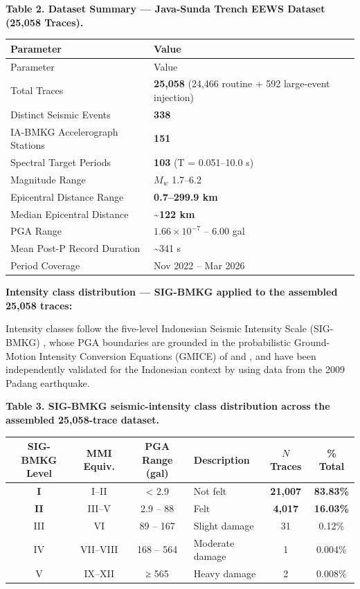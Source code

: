 \documentclass[10pt]{article}
\renewcommand{\cite}[1]{\citep{#1}}
\begin{document}
\par\vspace{16pt}\noindent\begingroup\centering\fontsize{8}{10}\selectfont\textbf{Table 2. Dataset Summary --- Java-Sunda Trench EEWS Dataset (25,058 Traces).}\par\endgroup\vspace{6pt}
\begin{longtable}[]{@{}>{\raggedright\arraybackslash}p{4cm}>{\raggedright\arraybackslash}p{8cm}@{}}
\toprule
Parameter & Value \\
\midrule
\endfirsthead
\toprule
Parameter & Value \\
\midrule
\endhead
\bottomrule
\endlastfoot
Total Traces & \textbf{25,058} (24,466 routine + 592 large-event injection) \\
Distinct Seismic Events & \textbf{338} \\
IA-BMKG Accelerograph Stations & \textbf{151}  \\
Spectral Target Periods & \textbf{103} (T = 0.051--10.0 s) \\
Magnitude Range & \(M_w\) 1.7--6.2 \\
Epicentral Distance Range & \textbf{0.7--299.9 km} \\
Median Epicentral Distance & \textbf{\textasciitilde122 km} \\
PGA Range & \(1.66 \times 10^{-7}\) -- 6.00 gal \\
Mean Post-P Record Duration & \textasciitilde341 s \\
Period Coverage & Nov 2022 -- Mar 2026 \\
\end{longtable}

\textbf{Intensity class distribution --- SIG-BMKG \cite{BMKG2016} applied to the assembled 25,058 traces:}

Intensity classes follow the five-level Indonesian Seismic Intensity Scale (SIG-BMKG) \cite{BMKG2016}, whose PGA boundaries are grounded in the probabilistic Ground-Motion Intensity Conversion Equations (GMICE) of \citet{Worden2012} and \citet{Wald1999}, and have been independently validated for the Indonesian context by \citet{Caprio2015} using data from the 2009 Padang earthquake.

\begin{center}\fontsize{8}{10}\selectfont\textbf{Table 3. SIG-BMKG seismic-intensity class distribution across the assembled 25{,}058-trace dataset.}\end{center}

\begin{longtable}[]{@{}ccclcc@{}}
\toprule
SIG-BMKG Level & MMI Equiv. & PGA Range (gal) & Description & \(N\) Traces & \% Total\tabularnewline
\midrule
\endhead
\textbf{I} & I--II & \textless{} 2.9 & Not felt & \textbf{21,007} & \textbf{83.83\%}\tabularnewline
\textbf{II} & III--V & 2.9 -- 88 & Felt & \textbf{4,017} & \textbf{16.03\%}\tabularnewline
III & VI & 89 -- 167 & Slight damage & 31 & 0.12\%\tabularnewline
IV & VII--VIII & 168 -- 564 & Moderate damage & 1 & 0.004\%\tabularnewline
V & IX--XII & ≥ 565 & Heavy damage & 2 & 0.008\%\tabularnewline
\bottomrule
\end{longtable}
\end{document}
